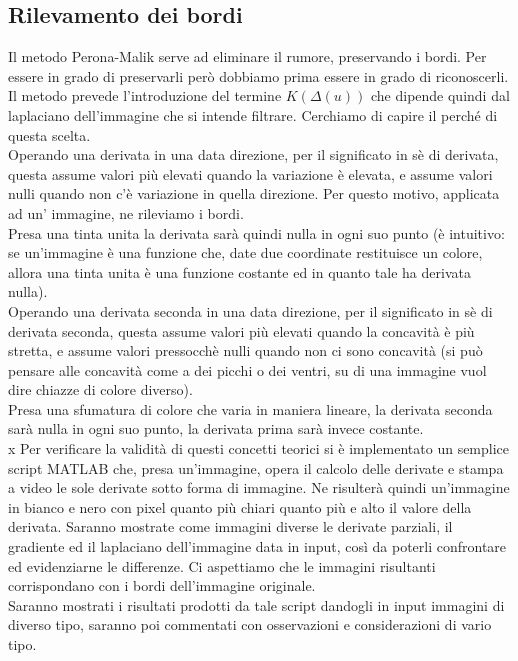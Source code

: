 \newpage
\subsection{Rilevamento dei bordi}
Il metodo Perona-Malik serve ad eliminare il rumore, preservando i bordi. Per essere in grado di preservarli però dobbiamo prima essere in grado di riconoscerli. Il metodo prevede l'introduzione del termine $K(\Delta(u))$ che dipende quindi dal laplaciano dell'immagine che si intende filtrare. Cerchiamo di capire il perché di questa scelta.\\
\vspace{1em}
Operando una derivata in una data direzione, per il significato in sè di derivata, questa assume valori più elevati quando la variazione è elevata, e assume valori nulli quando non c'è variazione in quella direzione. Per questo motivo, applicata ad un' immagine, ne rileviamo i bordi.\\
Presa una tinta unita la derivata sarà quindi nulla in ogni suo punto (è intuitivo: se un'immagine è una funzione che, date due coordinate restituisce un colore, allora una tinta unita è una funzione costante ed in quanto tale ha derivata nulla).\\
Operando una derivata seconda in una data direzione, per il significato in sè di derivata seconda, questa assume valori più elevati quando la concavità è più stretta, e assume valori pressocchè nulli quando non ci sono concavità (si può pensare alle concavità come a dei picchi o dei ventri, su di una immagine vuol dire chiazze di colore diverso).\\
Presa una sfumatura di colore che varia in maniera lineare, la derivata seconda sarà nulla in ogni suo punto, la derivata prima sarà invece costante.\\x
\vspace{1em}
Per verificare la validità di questi concetti teorici si è implementato un semplice script MATLAB che, presa un'immagine, opera il calcolo delle derivate e stampa a video le sole derivate sotto forma di immagine. Ne risulterà quindi un'immagine in bianco e nero con pixel quanto più chiari quanto più e alto il valore della derivata. Saranno mostrate come immagini diverse le derivate parziali, il gradiente ed il laplaciano dell'immagine data in input, così da poterli confrontare ed evidenziarne le differenze. Ci aspettiamo che le immagini risultanti corrispondano con i bordi dell'immagine originale.\\
Saranno mostrati i risultati prodotti da tale script dandogli in input immagini di diverso tipo, saranno poi commentati con osservazioni e considerazioni di vario tipo.
